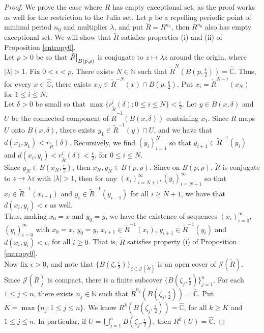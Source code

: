 \documentclass[11pt,letterpaper]{article}
\theoremstyle{definition}
\newcommand\restr[2]{{%
  \left.\kern-\nulldelimiterspace %
  #1 %
  \vphantom{\big|} %
  \right|_{#2} %
  }}
\begin{document}
\begin{proof}
We prove the case where $R$ has empty exceptional set, as the proof works as well for the restriction to the Julia set. Let $p$ be a repelling periodic point of minimal period $n_0$ and multiplier $\lambda$, and put $\tilde{R}=R^{n_0}$, then $R^{n_0}$ also has empty exceptional set. We will show that $\tilde{R}$ satisfies properties (i) and (ii) of Proposition \ref{entropy0}.
\\

Let $\rho>0$ be so that $\restr{\tilde{R}}{B(p,\rho)}$ is conjugate to $z\mapsto \lambda z$ around the origin, where $|\lambda |>1$. Fix $0<\epsilon<\rho$. There exists $N\in\mathbb{N}$ such that $\tilde{R}^N(B(p,\frac{\epsilon}{2}))=\widehat{\mathbb{C}}$. Thus, for every $x\in\widehat{\mathbb{C}}$, there exists $x_N\in \tilde{R}^{-N}(x)\cap B(p,\frac{\epsilon}{2})$. Put $x_i=\tilde{R}^{N-i}(x_N)$ for $1\leq i\leq N$.
\\

Let $\delta>0$ be small so that $\max\lbrace r_{\tilde{R}}^i(\delta):0\leq i\leq N\rbrace<\frac{\epsilon}{2}$. Let $y\in B(x,\delta)$ and $U$ be the connected component of $\tilde{R}^{-1}(B(x,\delta))$ containing $x_1$. Since $\tilde{R}$ maps $U$ onto $B(x,\delta)$, there exists  $y_1\in \tilde{R}^{-1}(y)\cap U$, and we have that $d(x_1,y_1)< r_{\tilde{R}}(\delta)$. Recursively, we find $(y_i)_{i=1}^N$ so that $y_{i+1}\in \tilde{R}^{-1}(y_i)$ and $d(x_i,y_i)<r_{\tilde{R}}^i(\delta)<\frac{\epsilon}{2}$, for $0\leq i\leq N$.\\

Since $y_N\in B(x_N,\frac{\epsilon}{2})$, then $x_N,y_N\in B(p,\rho)$. Since on $B(p,\rho)$, $\tilde{R}$ is conjugate to $z\to\lambda z$ with $|\lambda|>1$, then for any $(x_i)_{i=N+1}^\infty, (y_i)_{i=N+1}^\infty$ so that $x_i\in \tilde{R}^{-1}(x_{i-1})$ and $y_i\in \tilde{R}^{-1}(y_{i-1})$ for all $i\geq N+1$, we have that $d(x_i,y_i)<\epsilon$ as well.
\\

Thus, making $x_0=x$ and $y_0=y$, we have the existence of sequences $(x_i)_{i=0}^\infty$, $(y_i)_{i=0}^\infty$ with $x_0=x$, $y_0=y$, $x_{i+1}\in\tilde{R}^{-1}(x_i)$, $y_{i+1}\in \tilde{R}^{-1}(y_i)$ and $d(x_i,y_i)<\epsilon$, for all $i\geq 0$. That is, $\tilde{R}$ satisfies property (i) of Proposition \ref{entropy0}.
\\

Now fix $\epsilon>0$, and note that $\lbrace B(\zeta,\frac{\epsilon}{2})\rbrace_{\zeta\in\mathcal{J}(\tilde{R})}$ is an open cover of $\mathcal{J}(\tilde{R})$. Since $\mathcal{J}(\tilde{R})$ is compact, there is a finite subcover $\lbrace B(\zeta_j,\frac{\epsilon}{2})\rbrace_{j=1}^n$. For each $1\leq j\leq n$, there exists $n_j\in\mathbb{N}$ such that $\tilde{R}^{n_j}(B(\zeta_j,\frac{\epsilon}{2}))=\widehat{\mathbb{C}}$. Put $K=\max\lbrace n_j:1\leq j\leq n\rbrace$. We know $R^k(B(\zeta_j,\frac{\epsilon}{2}))=\widehat{\mathbb{C}}$, for all $k\geq K$ and $1\leq j\leq n$. In particular, if $U=\bigcup_{j=1}^n B(\zeta_j,\frac{\epsilon}{2})$, then $R^k(U)=\widehat{\mathbb{C}}$.


\end{proof}
\end{document}

